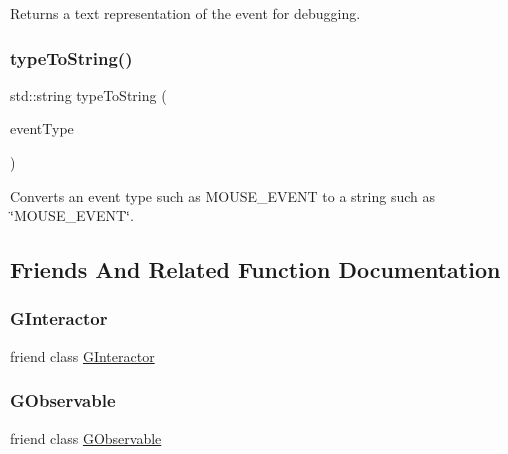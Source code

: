 Returns a text representation of the event for debugging. 

\mbox{\label{classsgl_1_1GEvent_abfc45737c7f2e261401203a0c959c103}} 
\subsubsection{\texorpdfstring{type\+To\+String()}{typeToString()}}
{\footnotesize\ttfamily std\+::string type\+To\+String (\begin{DoxyParamCaption}\item[{\mbox{\hyperlink{namespacesgl_a2628ea8d12e8b2563c32f05dc7fff6fa}{Event\+Type}}}]{event\+Type }\end{DoxyParamCaption})\hspace{0.3cm}{\ttfamily [static]}}



Converts an event type such as M\+O\+U\+S\+E\+\_\+\+E\+V\+E\+NT to a string such as \char`\"{}\+M\+O\+U\+S\+E\+\_\+\+E\+V\+E\+N\+T\char`\"{}. 



\subsection{Friends And Related Function Documentation}
\mbox{\label{classsgl_1_1GEvent_a054e99eaa992da5c1a77c8d7b3817788}} 
\subsubsection{\texorpdfstring{G\+Interactor}{GInteractor}}
{\footnotesize\ttfamily friend class \mbox{\hyperlink{classsgl_1_1GInteractor}{G\+Interactor}}\hspace{0.3cm}{\ttfamily [friend]}}

\mbox{\label{classsgl_1_1GEvent_ab2c4a87c15be41d9bef82e78272b6a70}} 
\subsubsection{\texorpdfstring{G\+Observable}{GObservable}}
{\footnotesize\ttfamily friend class \mbox{\hyperlink{classsgl_1_1GObservable}{G\+Observable}}\hspace{0.3cm}{\ttfamily [friend]}}



